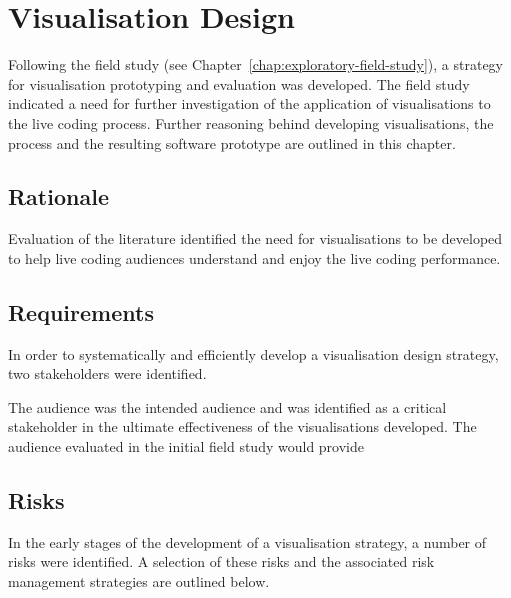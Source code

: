 
\chapter{Visualisation Design}
\label{chap:visualisation-design}

Following the field study (see Chapter~\ref{chap:exploratory-field-study}), a strategy for visualisation prototyping and evaluation was developed. The field study indicated a need for further investigation of the application of visualisations to the live coding process. Further reasoning behind developing visualisations, the process and the resulting software prototype are outlined in this chapter.


\section{Rationale}

Evaluation of the literature identified the need for visualisations to be developed to help live coding audiences understand and enjoy the live coding performance.


\section{Requirements}

In order to systematically and efficiently develop a visualisation design strategy, two stakeholders were identified.

The audience was the intended audience and was identified as a critical stakeholder in the ultimate effectiveness of the visualisations developed. The audience evaluated in the initial field study would provide 


% 


\section{Risks}


In the early stages of the development of a visualisation strategy, a number of risks were identified. A selection of these risks and the associated risk management strategies are outlined below.

